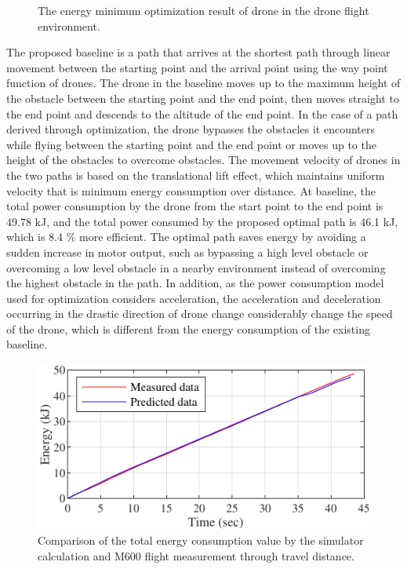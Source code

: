 \documentclass[journal]{./template/IEEEtran}
\begin{document}
\begin{figure}[ht]
\centering
{}
\qquad
{}
\caption{The energy minimum optimization result of drone in the drone flight environment.}
\label{fig: opt_environ}
\end{figure}

The proposed baseline is a path that arrives at the shortest path through linear movement between the starting point and the arrival point using the way point function of drones. The drone in the baseline moves up to the maximum height of the obstacle between the starting point and the end point, then moves straight to the end point and descends to the altitude of the end point. 
In the case of a path derived through optimization, the drone bypasses the obstacles it encounters while flying between the starting point and the end point or moves up to the height of the obstacles to overcome obstacles. 
The movement velocity of drones in the two paths is based on the translational lift effect, which maintains uniform velocity that is minimum energy consumption over distance. 
At baseline, the total power consumption by the drone from the start point to the end point is 49.78 kJ, and the total power consumed by the proposed optimal path is 46.1 kJ, which is 8.4 \% more efficient. The optimal path saves energy by avoiding a sudden increase in motor output, such as bypassing a high level obstacle or overcoming a low level obstacle in a nearby environment instead of overcoming the highest obstacle in the path.
In addition, as the power consumption model used for optimization considers acceleration, the acceleration and deceleration occurring in the drastic direction of drone change considerably change the speed of the drone, which is different from the energy consumption of the existing baseline.

\begin{figure}[ht]
\centering\includegraphics[scale=1.05]{fig14/S_E.pdf}
\caption{Comparison of the total energy consumption value by the simulator calculation and M600 flight measurement through travel distance.}
\label{fig:consumed_energy}
\end{figure}
\end{document}
